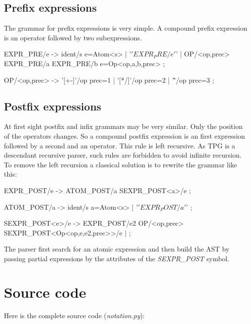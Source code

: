 \subsection{Prefix expressions}

The grammar for prefix expressions is very simple.
A compound prefix expression is an operator followed by two subexpressions.

\begin{verbatimtab}[4]
EXPR_PRE/e ->
	ident/s e=Atom<s>
|	'\(' EXPR_PRE/e '\)'
|	OP/<op,prec> EXPR_PRE/a EXPR_PRE/b e=Op<op,a,b,prec>
;

OP/<op,prec> ->
	'[+-]'/op prec=1
|	'[*/]'/op prec=2
|	'\^'/op   prec=3
;
\end{verbatimtab}

\subsection{Postfix expressions}

At first sight postfix and infix grammars may be very similar.
Only the position of the operators changes.
So a compound postfix expression is an first expression followed by a second and an operator.
This rule is left recursive.
As TPG is a descendant recursive parser, such rules are forbidden to avoid infinite recursion.
To remove the left recursion a classical solution is to rewrite the grammar like this:

\begin{verbatimtab}[4]
EXPR_POST/e -> ATOM_POST/a SEXPR_POST<a>/e ;

ATOM_POST/a ->
	ident/s a=Atom<s>
|	'\(' EXPR_POST/a '\)'
;

SEXPR_POST<e>/e ->
	EXPR_POST/e2 OP/<op,prec> SEXPR_POST<Op<op,e,e2,prec>>/e
|	;
\end{verbatimtab}

The parser first search for an atomic expression and then build the AST by passing partial expressions by the attributes of the \emph{SEXPR\_POST} symbol.

\section{Source code}

Here is the complete source code (\emph{notation.py}):

